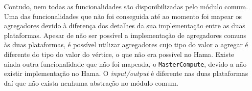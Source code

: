 Contudo, nem todas as funcionalidades são disponibilizadas pelo módulo comum. 
Uma das funcionalidades que não foi conseguida até ao momento foi mapear os 
agregadores devido à diferença dos detalhes da sua implementação entre as duas 
plataformas. Apesar de não ser possível a implementação de agregadores comuns às 
duas plataformas, é possível utilizar agregadores cujo tipo do valor a agregar é 
diferente do tipo do valor do vértice, o que não era possível no Hama. Existe 
ainda outra funcionalidade que não foi mapeada, o \texttt{MasterCompute}, devido 
a não existir implementação no Hama. O \textit{input/output} é diferente nas 
duas plataformas daí que não exista nenhuma abstração no módulo comum.